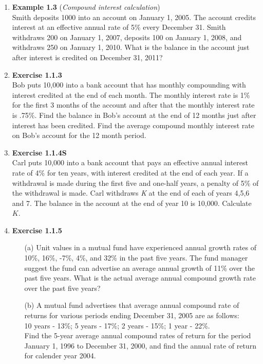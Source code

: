 \documentclass{article}
\begin{document}
	\begin{enumerate}
		\item \textbf{Example 1.3} (\textit{Compound interest calculation})\\ 
		Smith deposits 1000 into an account on January 1, 2005. The account credits interest at an effective annual rate of 5\% every December 31. Smith withdraws 200 on January 1, 2007, deposits 100 on January 1, 2008, and withdraws 250 on January 1, 2010. What is the balance in the account just after interest is credited on December 31, 2011?
		
		\item \textbf{Exercise 1.1.3}\\ 
		Bob puts 10,000 into a bank account that has monthly compounding with interest credited at the end of each month. The monthly interest rate is 1\% for the first 3 months of the account and after that the monthly interest rate is .75\%. Find the balance in Bob's account at the end of 12 months just after interest has been credited. Find the average compound monthly interest rate on Bob's account for the 12 month period.
		
		\item \textbf{Exercise 1.1.4S}\\
		Carl puts 10,000 into a bank account that pays an effective annual interest rate of 4\% for ten years, with interest credited at the end of each year. If a withdrawal is made during the first five and one-half years, a penalty of 5\% of the withdrawal is made. Carl withdraws \textit{K} at the end of each of years 4,5,6 and 7. The balance in the account at the end of year 10 is 10,000. Calculate $K$.
		
		\item \textbf{Exercise 1.1.5}
		\begin{enumerate}
			\item[(a)] Unit values in a mutual fund have experienced annual growth rates of 10\%, 16\%, -7\%, 4\%, and 32\% in the past five years. The fund manager suggest the fund can advertise an average annual growth of 11\% over the past five years. What is the actual average annual compound growth rate over the past five years?
			\item[(b)] A mutual fund advertises that average annual compound rate of returns for various periods ending December 31, 2005 are as follows:\\
			10 years - 13\%; 5 years - 17\%; 2 years - 15\%; 1 year - 22\%.\\
			Find the 5-year average annual compound rates of return for the period January 1, 1996 to December 31, 2000, and find the annual rate of return for calender year 2004.
		\end{enumerate}
	\end{enumerate}
	
\end{document}
